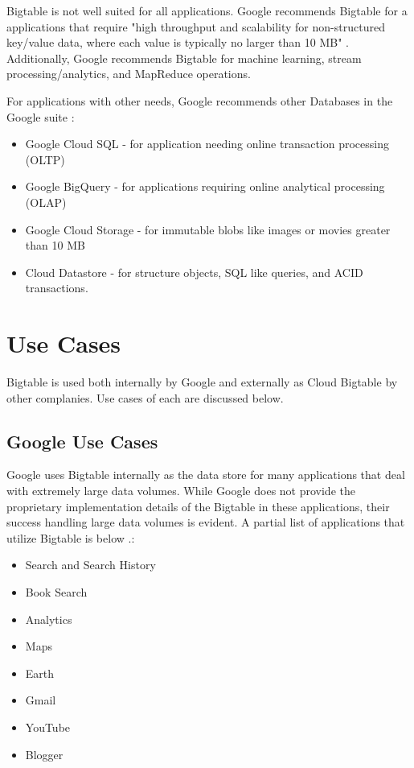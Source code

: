 \documentclass[9pt,twocolumn,twoside]{styles/osajnl}
\begin{document}
Bigtable is not well suited for all applications.  Google recommends Bigtable for a applications that require "high throughput and scalability for non-structured key/value data, where each value is typically no larger than 10 MB" \cite{www-bigtabledocoverview}.  Additionally, Google recommends Bigtable for machine learning, stream processing/analytics, and MapReduce operations.\cite{www-bigtabledocoverview}

For applications with other needs, Google recommends other Databases in the Google suite \cite{www-bigtabledocoverview}:

\vspace{-\topsep}
\begin{itemize}
\item Google Cloud SQL - for application needing online transaction processing (OLTP)
\item Google BigQuery - for applications requiring online analytical processing (OLAP) 
\item Google Cloud Storage - for immutable blobs like images or movies greater than 10 MB 
\item Cloud Datastore - for structure objects, SQL like queries, and ACID transactions.
\end{itemize}
\vspace{-\topsep}

\section{Use Cases}

Bigtable is used both internally by Google and externally as Cloud Bigtable by other complanies.  Use cases of each are discussed below.

\subsection{Google Use Cases}

Google uses Bigtable internally as the data store for many applications that deal with extremely large data volumes. While Google does not provide the proprietary implementation details of the Bigtable in these applications, their success handling large data volumes is evident.  A partial list of applications that utilize Bigtable is below \cite{www-wikibigtable}.:


\vspace{-\topsep}
\begin{itemize}
\item Search and Search History
\item Book Search
\item Analytics  
\item Maps
\item Earth
\item Gmail 
\item YouTube
\item Blogger

\end{itemize}
\vspace{-\topsep}
\end{document}
